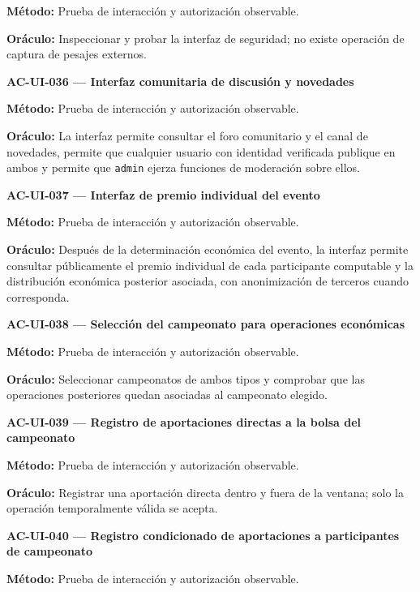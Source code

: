 \documentclass[10pt,letterpaper]{article}
\begin{document}
\textbf{Método:} Prueba de interacción y autorización observable.\par
\textbf{Oráculo:} Inspeccionar y probar la interfaz de seguridad; no existe operación de captura de pesajes externos.\par\vspace{0.45em}
\noindent\textbf{AC-UI-036 --- Interfaz comunitaria de discusión y novedades}\par
\textbf{Método:} Prueba de interacción y autorización observable.\par
\textbf{Oráculo:} La interfaz permite consultar el foro comunitario y el canal de novedades, permite que cualquier usuario con identidad verificada publique en ambos y permite que \texttt{admin} ejerza funciones de moderación sobre ellos.\par\vspace{0.45em}
\noindent\textbf{AC-UI-037 --- Interfaz de premio individual del evento}\par
\textbf{Método:} Prueba de interacción y autorización observable.\par
\textbf{Oráculo:} Después de la determinación económica del evento, la interfaz permite consultar públicamente el premio individual de cada participante computable y la distribución económica posterior asociada, con anonimización de terceros cuando corresponda.\par\vspace{0.45em}
\noindent\textbf{AC-UI-038 --- Selección del campeonato para operaciones económicas}\par
\textbf{Método:} Prueba de interacción y autorización observable.\par
\textbf{Oráculo:} Seleccionar campeonatos de ambos tipos y comprobar que las operaciones posteriores quedan asociadas al campeonato elegido.\par\vspace{0.45em}
\noindent\textbf{AC-UI-039 --- Registro de aportaciones directas a la bolsa del campeonato}\par
\textbf{Método:} Prueba de interacción y autorización observable.\par
\textbf{Oráculo:} Registrar una aportación directa dentro y fuera de la ventana; solo la operación temporalmente válida se acepta.\par\vspace{0.45em}
\noindent\textbf{AC-UI-040 --- Registro condicionado de aportaciones a participantes de campeonato}\par
\textbf{Método:} Prueba de interacción y autorización observable.\par
\end{document}
